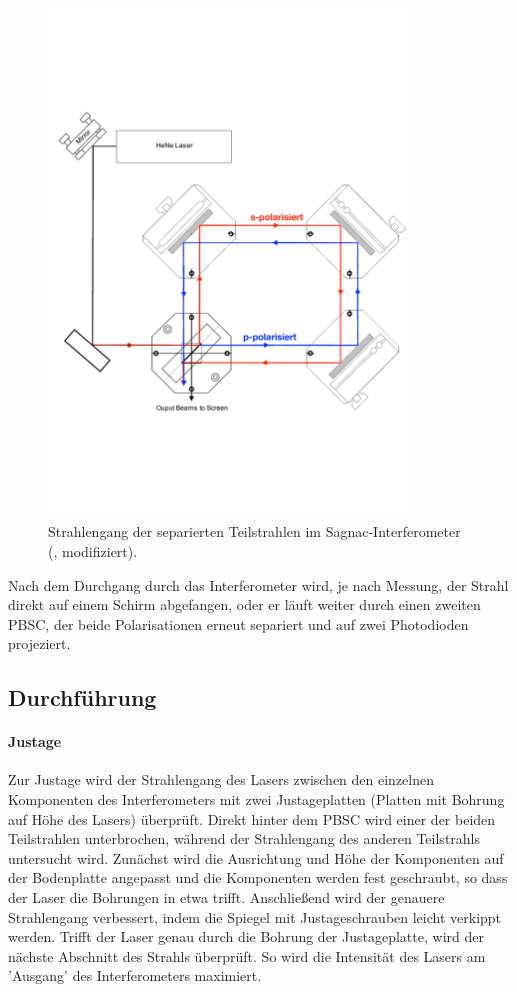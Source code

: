 \begin{figure}[h!]
  \centering
  \includegraphics[width=0.85\textwidth]{content/images/interferometer_teil.pdf}
  \caption{Strahlengang der separierten Teilstrahlen im Sagnac-Interferometer  (\cite{teachspin}, modifiziert).}
  \label{fig:int_teil}
\end{figure}
Nach dem Durchgang durch das Interferometer wird, je nach Messung, der Strahl direkt auf einem Schirm abgefangen, oder er läuft weiter durch einen zweiten PBSC, der beide Polarisationen erneut separiert und auf zwei Photodioden projeziert.
\FloatBarrier

\subsection{Durchführung}
\paragraph{Justage}
Zur Justage wird der Strahlengang des Lasers zwischen den einzelnen Komponenten des Interferometers mit zwei Justageplatten (Platten mit Bohrung auf Höhe des Lasers) überprüft.
Direkt hinter dem PBSC wird einer der beiden Teilstrahlen unterbrochen, während der Strahlengang des anderen Teilstrahls untersucht wird.
Zunächst wird die Ausrichtung und Höhe der Komponenten auf der Bodenplatte angepasst und die Komponenten werden fest geschraubt, so dass der Laser die Bohrungen in etwa trifft.
Anschließend wird der genauere Strahlengang verbessert, indem die Spiegel mit Justageschrauben leicht verkippt werden.
Trifft der Laser genau durch die Bohrung der Justageplatte, wird der nächste Abschnitt des Strahls überprüft.
So wird die Intensität des Lasers am 'Ausgang' des Interferometers maximiert.

